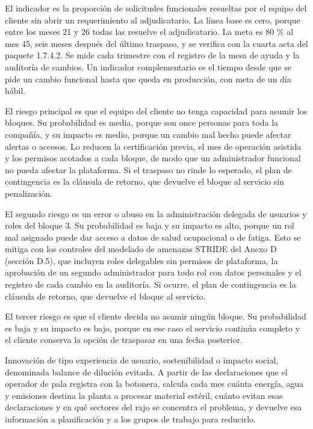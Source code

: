 \documentclass[subdoc]{../../comun/overfore}
\begin{document}
El indicador es la proporción de solicitudes funcionales resueltas por el equipo del cliente sin abrir un requerimiento al adjudicatario. La línea base es cero, porque entre los meses 21 y 26 todas las resuelve el adjudicatario. La meta es 80 \% al mes 45, seis meses después del último traspaso, y se verifica con la cuarta acta del paquete 1.7.4.2. Se mide cada trimestre con el registro de la mesa de ayuda y la auditoría de cambios. Un indicador complementario es el tiempo desde que se pide un cambio funcional hasta que queda en producción, con meta de un día hábil.

El riesgo principal es que el equipo del cliente no tenga capacidad para asumir los bloques. Su probabilidad es media, porque son once personas para toda la compañía, y su impacto es medio, porque un cambio mal hecho puede afectar alertas o accesos. Lo reducen la certificación previa, el mes de operación asistida y los permisos acotados a cada bloque, de modo que un administrador funcional no pueda afectar la plataforma. Si el traspaso no rinde lo esperado, el plan de contingencia es la cláusula de retorno, que devuelve el bloque al servicio sin penalización.

El segundo riesgo es un error o abuso en la administración delegada de usuarios y roles del bloque 3. Su probabilidad es baja y su impacto es alto, porque un rol mal asignado puede dar acceso a datos de salud ocupacional o de fatiga. Esto se mitiga con los controles del modelado de amenazas STRIDE del Anexo D (sección D.5), que incluyen roles delegables sin permisos de plataforma, la aprobación de un segundo administrador para todo rol con datos personales y el registro de cada cambio en la auditoría. Si ocurre, el plan de contingencia es la cláusula de retorno, que devuelve el bloque al servicio.

El tercer riesgo es que el cliente decida no asumir ningún bloque. Su probabilidad es baja y su impacto es bajo, porque en ese caso el servicio continúa completo y el cliente conserva la opción de traspasar en una fecha posterior.

Innovación de tipo experiencia de usuario, sostenibilidad o impacto social, denominada balance de dilución evitada. A partir de las declaraciones que el operador de pala registra con la botonera, calcula cada mes cuánta energía, agua y emisiones destina la planta a procesar material estéril, cuánto evitan esas declaraciones y en qué sectores del rajo se concentra el problema, y devuelve esa información a planificación y a los grupos de trabajo para reducirlo.
\end{document}
